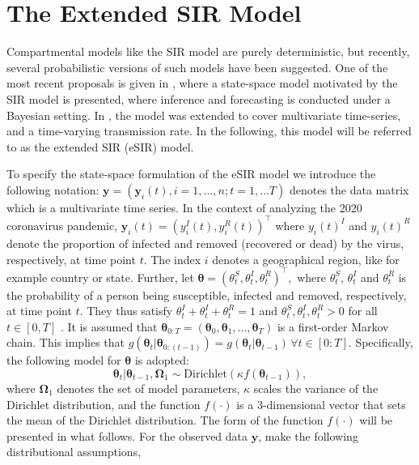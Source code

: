 \documentclass[10pt,a4paper]{article}
\begin{document}
\section{The Extended SIR Model}
Compartmental models like the SIR model are purely deterministic, but recently, several probabilistic versions of such models have been suggested. One of the most recent proposals is given in \cite{osthus2017forecasting}, where a state-space model motivated by the SIR model is presented, where inference and forecasting is conducted under a Bayesian setting. In \cite{song2020epidemiological}, the model was extended to cover multivariate time-series, and a time-varying transmission rate. In the following, this model will be referred to as the extended SIR (eSIR) model. 

To specify the state-space formulation of the eSIR model we introduce the following notation: 
%
$
\mathbf{y} = (\mathbf{y}_{i}(t), i = 1, \ldots, n; t = 1, \ldots T) 
$
%
denotes the data matrix which is a multivariate time series. In the context of analyzing the 2020 coronavirus pandemic, 
%
$
\mathbf{y}_{i}(t) = (y_{i}^I(t), y_{i}^R(t))^\top
$
%
where $y_{i}(t)^I$ and $y_{i}(t)^R$ denote the proportion of infected and removed (recovered or dead) by the virus, respectively, at time point $t$. The index $i$ denotes a geographical region, like for example country or state. Further, let  
%
$
\boldsymbol{\theta} = (\theta_t^S, \theta_t^I, \theta_t^R)^\top,
$
%
where $\theta_t^S$, $\theta_t^I$ and $\theta_t^R$ is the probability of a person being susceptible, infected and removed, respectively, at time point $t$. They thus satisfy 
%
$
\theta_t^I + \theta_t^I + \theta_t^R = 1
$
% 
and 
%
$
\theta_t^S, \theta_t^I, \theta_t^R > 0
$
%
for all $t \in [0, T]$ \parencite{osthus2017forecasting}. It is assumed that 
%
$
\boldsymbol{\theta}_{0:T} = (\boldsymbol{\theta}_0, \boldsymbol{\theta}_1, \ldots, \boldsymbol{\theta}_T)
$
%
is a first-order Markov chain. This implies that 
%
$
g(\boldsymbol{\theta}_t|\boldsymbol{\theta}_{0:(t-1)}) = g(\boldsymbol{\theta}_t|\boldsymbol{\theta}_{t-1}) \, \forall t \in [0:T]. 
$
%
Specifically, the following model for $\boldsymbol{\theta}$ is adopted:
%
\begin{equation}\label{Dirichlet}
\boldsymbol{\theta}_t | \boldsymbol{\theta}_{t-1}, \boldsymbol{\Omega}_1 \sim \text{Dirichlet}(\kappa f(\boldsymbol{\theta}_{t-1})),
\end{equation}
%
where $\boldsymbol{\Omega}_1$ denotes the set of model parameters, $\kappa$ scales the variance of the Dirichlet distribution, and the function $f(\cdot)$ is a 3-dimensional vector that sets the mean of the Dirichlet distribution. The form of the function $f(\cdot)$ will be presented in what follows. For the observed data $\mathbf{y}$, \cite{song2020epidemiological} make the following distributional assumptions,  
\end{document}
